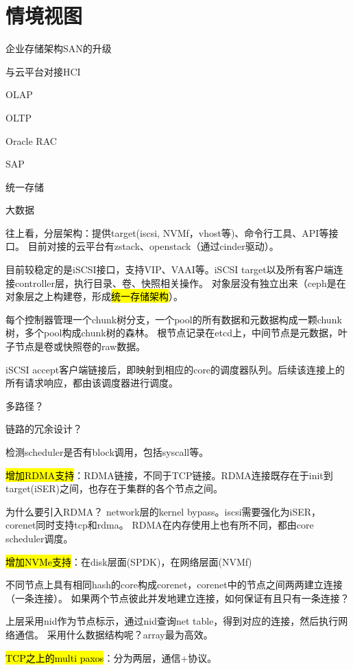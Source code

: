 \chapter{情境视图}

\begin{enumbox}
\item 企业存储架构SAN的升级
\item 与云平台对接HCI
\item OLAP
\item OLTP
\item Oracle RAC
\item SAP
\item 统一存储
\item 大数据
\end{enumbox}

往上看，分层架构：提供target(iscsi, NVMf，vhost等)、命令行工具、API等接口。
目前对接的云平台有zstack、openstack（通过cinder驱动）。

目前较稳定的是iSCSI接口，支持VIP、VAAI等。iSCSI target以及所有客户端连接controller层，执行目录、卷、快照相关操作。
对象层没有独立出来（ceph是在对象层之上构建卷，形成\hl{统一存储架构}）。

每个控制器管理一个chunk树分支，一个pool的所有数据和元数据构成一颗chunk树，多个pool构成chunk树的森林。
根节点记录在etcd上，中间节点是元数据，叶子节点是卷或快照卷的raw数据。

iSCSI accept客户端链接后，即映射到相应的core的调度器队列。后续该连接上的所有请求响应，都由该调度器进行调度。

多路径？

链路的冗余设计？

检测scheduler是否有block调用，包括syscall等。

\hl{增加RDMA支持}：RDMA链接，不同于TCP链接。RDMA连接既存在于init到target(iSER)之间，也存在于集群的各个节点之间。

为什么要引入RDMA？ network层的kernel bypass。iscsi需要强化为iSER，corenet同时支持tcp和rdma。
RDMA在内存使用上也有所不同，都由core scheduler调度。

\hl{增加NVMe支持}：在disk层面(SPDK)，在网络层面(NVMf)

不同节点上具有相同hash的core构成corenet，corenet中的节点之间两两建立连接（一条连接）。
如果两个节点彼此并发地建立连接，如何保证有且只有一条连接？

上层采用nid作为节点标示，通过nid查询net table，得到对应的连接，然后执行网络通信。
采用什么数据结构呢？array最为高效。

\hl{TCP之上的multi paxos}：分为两层，通信+协议。
